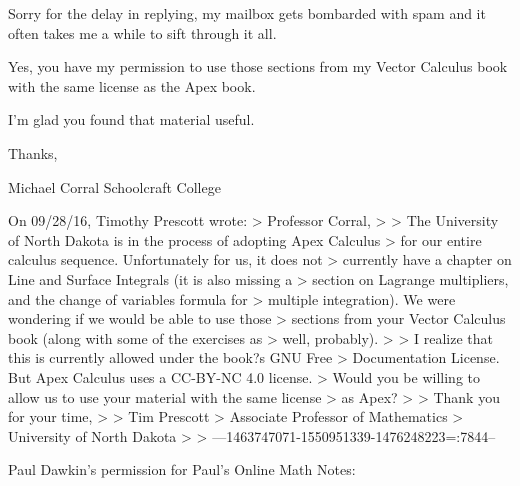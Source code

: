 Sorry for the delay in replying, my mailbox gets bombarded with
spam and it often takes me a while to sift through it all.

Yes, you have my permission to use those sections from my Vector
Calculus book with the same license as the Apex book.

I'm glad you found that material useful.

Thanks,

Michael Corral
Schoolcraft College

On 09/28/16, Timothy Prescott wrote:
> Professor Corral,
> 
> The University of North Dakota is in the process of adopting Apex Calculus
> for our entire calculus sequence.  Unfortunately for us, it does not
> currently have a chapter on Line and Surface Integrals (it is also missing a
> section on Lagrange multipliers, and the change of variables formula for
> multiple integration).  We were wondering if we would be able to use those
> sections from your Vector Calculus book (along with some of the exercises as
> well, probably).
> 
> I realize that this is currently allowed under the book?s GNU Free
> Documentation License.  But Apex Calculus uses a CC-BY-NC 4.0 license. 
> Would you be willing to allow us to use your material with the same license
> as Apex?
> 
> Thank you for your time,
> 
> Tim Prescott
> Associate Professor of Mathematics
> University of North Dakota
> 
>
---1463747071-1550951339-1476248223=:7844--


Paul Dawkin's permission for Paul's Online Math Notes:


